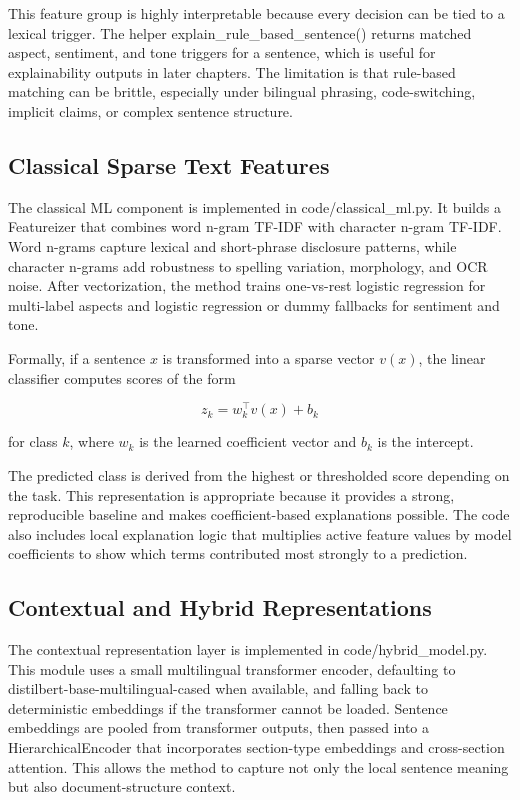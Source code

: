 \documentclass[english, online, cse, master]{dithesis}
\begin{document}
This feature group is highly interpretable because every decision can be tied to a lexical trigger. The helper explain\_rule\_based\_sentence() returns matched aspect, sentiment, and tone triggers for a sentence, which is useful for explainability outputs in later chapters. The limitation is that rule-based matching can be brittle, especially under bilingual phrasing, code-switching, implicit claims, or complex sentence structure.

\subsection{Classical Sparse Text Features}

The classical ML component is implemented in code/classical\_ml.py. It builds a Featureizer that combines word n-gram TF-IDF with character n-gram TF-IDF. Word n-grams capture lexical and short-phrase disclosure patterns, while character n-grams add robustness to spelling variation, morphology, and OCR noise. After vectorization, the method trains one-vs-rest logistic regression for multi-label aspects and logistic regression or dummy fallbacks for sentiment and tone.

Formally, if a sentence \(x\) is transformed into a sparse vector \(v(x)\),
the linear classifier computes scores of the form

\[
z_k = w_k^\top v(x) + b_k
\]

for class \(k\), where \(w_k\) is the learned coefficient vector and \(b_k\)
is the intercept. 

The predicted class is derived from the highest or thresholded score depending on the task. This representation is appropriate because it provides a strong, reproducible baseline and makes coefficient-based explanations possible. The code also includes local explanation logic that multiplies active feature values by model coefficients to show which terms contributed most strongly to a prediction.

\subsection{Contextual and Hybrid Representations}

The contextual representation layer is implemented in code/hybrid\_model.py. This module uses a small multilingual transformer encoder, defaulting to distilbert-base-multilingual-cased when available, and falling back to deterministic embeddings if the transformer cannot be loaded. Sentence embeddings are pooled from transformer outputs, then passed into a HierarchicalEncoder that incorporates section-type embeddings and cross-section attention. This allows the method to capture not only the local sentence meaning but also document-structure context.
\end{document}
